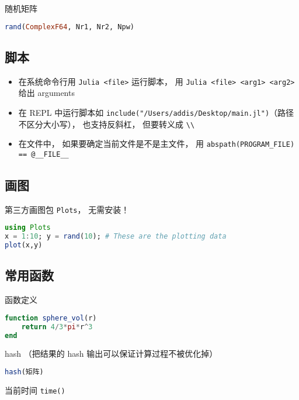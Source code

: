 随机矩阵
\begin{lstlisting}[language=Julia]
rand(ComplexF64, Nr1, Nr2, Npw)
\end{lstlisting}

\subsection{脚本}
\begin{itemize}
\item 在系统命令行用 \verb|Julia <file>| 运行脚本， 用 \verb|Julia <file> <arg1> <arg2>| 给出 arguments
\item 在 REPL 中运行脚本如 \verb|include("/Users/addis/Desktop/main.jl")|（路径不区分大小写）， 也支持反斜杠， 但要转义成 \verb|\\|
\item 在文件中， 如果要确定当前文件是不是主文件， 用 \verb|abspath(PROGRAM_FILE) == @__FILE__|
\end{itemize}

\subsection{画图}
第三方画图包 \verb|Plots|， 无需安装！
\begin{lstlisting}[language=Julia]
using Plots
x = 1:10; y = rand(10); # These are the plotting data
plot(x,y)
\end{lstlisting}

\subsection{常用函数}
函数定义
\begin{lstlisting}[language=Julia]
function sphere_vol(r)
    return 4/3*pi*r^3
end
\end{lstlisting}

hash （把结果的 hash 输出可以保证计算过程不被优化掉）
\begin{lstlisting}[language=Julia]
hash(矩阵)
\end{lstlisting}

当前时间 \verb|time()|
